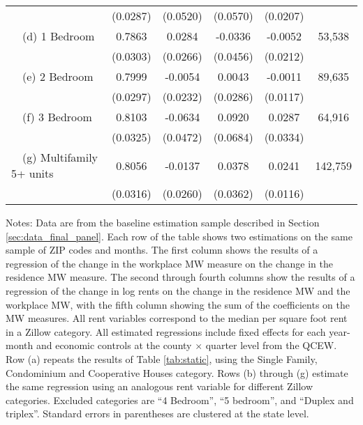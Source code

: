 \begin{landscape}
\begin{table}[ht!]
\begin{tabular}{@{}lccccc@{}}
                                                 & (0.0287) & (0.0520) & (0.0570) & (0.0207) &      \\
        $\quad$(d) 1 Bedroom                     &  0.7863  &  0.0284  &  -0.0336  &  -0.0052  & 53,538 \\
                                                 & (0.0303) & (0.0266) & (0.0456) & (0.0212) &      \\
        $\quad$(e) 2 Bedroom                     &  0.7999  &  -0.0054  &  0.0043  &  -0.0011  & 89,635 \\
                                                 & (0.0297) & (0.0232) & (0.0286) & (0.0117) &      \\
        $\quad$(f) 3 Bedroom                     &  0.8103  &  -0.0634  &  0.0920  &  0.0287  & 64,916 \\
                                                 & (0.0325) & (0.0472) & (0.0684) & (0.0334) &      \\
        $\quad$(g) Multifamily 5+ units          &  0.8056  &  -0.0137  &  0.0378  &  0.0241  & 142,759 \\
                                                 & (0.0316) & (0.0260) & (0.0362) & (0.0116) &      \\ \bottomrule
    \end{tabular}

    \begin{minipage}{.95\linewidth} \footnotesize
        \vspace{2mm}
        Notes:
        Data are from the baseline estimation sample described in Section 
        \ref{sec:data_final_panel}.
        Each row of the table shows two estimations on the same sample of ZIP 
        codes and months.
        The first column shows the results of a regression of the change in the 
        workplace MW measure on the change in the residence MW measure.
        The second through fourth columns show the results of a regression of 
        the change in log rents on the change in the residence MW and the 
        workplace MW, with the fifth column showing the sum of the coefficients 
        on the MW measures.
        All rent variables correspond to the median per square foot rent in a 
        Zillow category.
        All estimated regressions include fixed effects for each year-month and 
        economic controls at the county $\times$ quarter level from the QCEW.
        Row (a) repeats the results of Table \ref{tab:static}, using the 
        Single Family, Condominium and Cooperative Houses category.
        Rows (b) through (g) estimate the same regression using an analogous 
        rent variable for different Zillow categories.
        Excluded categories are ``4 Bedroom'', ``5 bedroom'', and 
        ``Duplex and triplex''.
        Standard errors in parentheses are clustered at the state level.
    \end{minipage}
\end{table}
\end{landscape}
